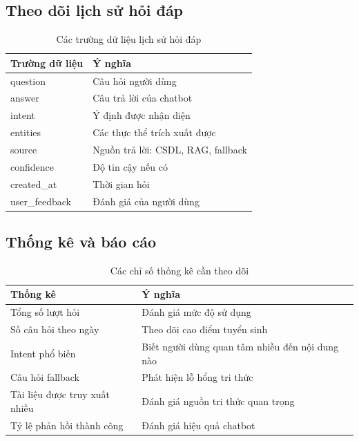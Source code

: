 \documentclass[12pt,a4paper]{report}
\begin{document}
\subsection{Theo dõi lịch sử hỏi đáp}
\begin{table}[H]
\centering
\caption{Các trường dữ liệu lịch sử hỏi đáp}
\label{tab:qa_history_fields}
\begin{tabular}{|p{3.6cm}|p{8.4cm}|}
\hline
\textbf{Trường dữ liệu} & \textbf{Ý nghĩa} \\ \hline
question & Câu hỏi người dùng \\ \hline
answer & Câu trả lời của chatbot \\ \hline
intent & Ý định được nhận diện \\ \hline
entities & Các thực thể trích xuất được \\ \hline
source & Nguồn trả lời: CSDL, RAG, fallback \\ \hline
confidence & Độ tin cậy nếu có \\ \hline
created\_at & Thời gian hỏi \\ \hline
user\_feedback & Đánh giá của người dùng \\ \hline
\end{tabular}
\end{table}

\subsection{Thống kê và báo cáo}
\begin{table}[H]
\centering
\caption{Các chỉ số thống kê cần theo dõi}
\label{tab:admin_statistics}
\begin{tabular}{|p{4cm}|p{8cm}|}
\hline
\textbf{Thống kê} & \textbf{Ý nghĩa} \\ \hline
Tổng số lượt hỏi & Đánh giá mức độ sử dụng \\ \hline
Số câu hỏi theo ngày & Theo dõi cao điểm tuyển sinh \\ \hline
Intent phổ biến & Biết người dùng quan tâm nhiều đến nội dung nào \\ \hline
Câu hỏi fallback & Phát hiện lỗ hổng tri thức \\ \hline
Tài liệu được truy xuất nhiều & Đánh giá nguồn tri thức quan trọng \\ \hline
Tỷ lệ phản hồi thành công & Đánh giá hiệu quả chatbot \\ \hline
\end{tabular}
\end{table}
\end{document}
